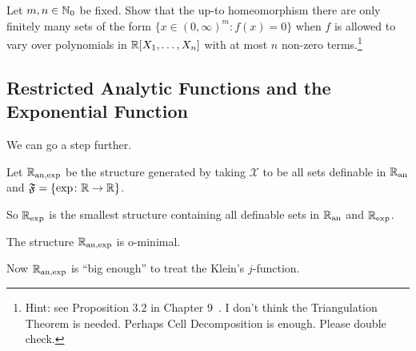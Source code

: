 \begin{exercise}
  Let $m,n\in{\mathbb{N}}_0$ be fixed. Show that the up-to homeomorphism there
  are only finitely many sets of the form
  $\{x\in (0,\infty)^m : f(x) =0\}$ when $f$ is allowed to vary over
  polynomials in ${\mathbb{R}}[X_1,\ldots,X_n]$ with at most $n$ non-zero
  terms.\footnote{Hint: see Proposition 3.2 in Chapter
    9~\cite{D:oMin}. I don't think the Triangulation Theorem is
    needed. Perhaps Cell Decomposition is enough. Please double check.}
\end{exercise}

\subsection{Restricted Analytic Functions and the Exponential Function}
We can go a step further.

\begin{definition}
  Let ${{\mathbb{R}}_{\mathrm{an,exp}}}$ be the structure generated by taking $\mathscr{X}$ to
  be all sets definable in ${{\mathbb{R}}_{\mathrm{an}}}$
  and $\mathfrak{F} = \{ \exp \colon {\mathbb{R}}\rightarrow{\mathbb{R}}\}$. 
\end{definition}

So ${{\mathbb{R}}_{\mathrm{exp}}}$ is the smallest structure containing all definable sets in
${{\mathbb{R}}_{\mathrm{an}}}$ and ${{\mathbb{R}}_{\mathrm{exp}}}$.

\begin{theorem}
  The structure ${{\mathbb{R}}_{\mathrm{an,exp}}}$ is o-minimal.
\end{theorem}

Now ${{\mathbb{R}}_{\mathrm{an,exp}}}$ is ``big enough'' to treat the Klein's
$j$-function. 

